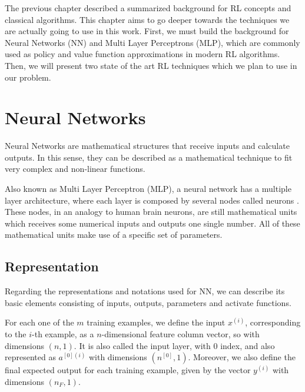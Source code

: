 
The previous chapter described a summarized background for RL concepts and classical algorithms. This chapter aims to go deeper towards the techniques we are actually going to use in this work. First, we must build the background for Neural Networks (NN) and Multi Layer Perceptrons (MLP), which are commonly used as policy and value function approximations in modern RL algorithms. Then, we will present two state of the art RL techniques which we plan to use in our problem.

\section{Neural Networks}

Neural Networks are mathematical structures that receive inputs and calculate outputs. In this sense, they can be described as a mathematical technique to fit very complex and non-linear functions.

Also known as Multi Layer Perceptron (MLP), a neural network has a multiple layer architecture, where each layer is composed by several nodes called neurons \cite{neuralnetworks}. These nodes, in an analogy to human brain neurons, are still mathematical units which receives some numerical inputs and outputs one single number. All of these mathematical units make use of a specific set of parameters.

\subsection{Representation}

Regarding the representations and notations used for NN, we can describe its basic elements consisting of inputs, outputs, parameters and activate functions.

For each one of the $m$ training examples, we define the input $x^{(i)}$, corresponding to the $i$-th example, as a $n$-dimensional feature column vector, so with dimensions $(n,1)$. It is also called the input layer, with $0$ index, and also represented as $a^{[0](i)}$ with dimensions $(n^{[0]},1)$. Moreover, we also define the final expected output for each training example, given by the vector $y^{(i)}$ with dimensions $(n_F,1)$.

